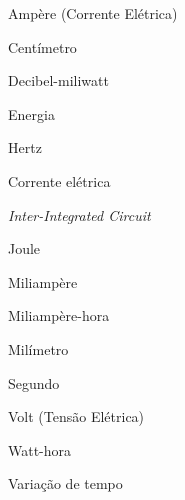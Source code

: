 \begin{simbolos}
  \item[$A$] Ampère (Corrente Elétrica)
  \item[$cm$] Centímetro
  \item[$dBm$] Decibel-miliwatt 
  \item[$E$] Energia 
  \item[$Hz$] Hertz
  \item[$I$] Corrente elétrica
  \item[$I^2C$] \textit{Inter-Integrated Circuit}
  \item[$J$] Joule
  \item[$mA$] Miliampère
  \item[$mAh$] Miliampère-hora
  \item[$mm$] Milímetro
  \item[$s$] Segundo
  \item[$V$] Volt (Tensão Elétrica)
  \item[$Wh$] Watt-hora
  \item[$\Delta t$] Variação de tempo
\end{simbolos}